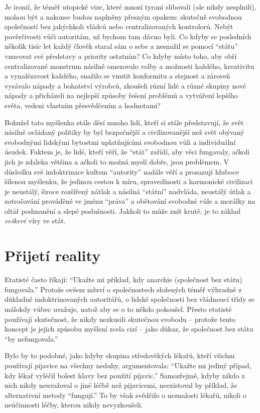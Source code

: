 \documentclass{book}
\begin{document}
Je ironií, že téměř utopické vize, které mnozí tyrani slibovali (ale nikdy nesplnili), mohou být a nakonec budou naplněny přesným opakem: skutečně svobodnou společností bez jakýchkoli vládců nebo centralizovaných kontrolorů. Nebýt pověrčivosti vůči autoritám, už bychom tam dávno byli. Co kdyby se posledních několik tisíc let každý člověk staral sám o sebe a nesnažil se pomocí \enquote{státu} vnucovat své představy a priority ostatním? Co kdyby místo toho, aby obří centralizované monstrum násilně omezovalo volby a možnosti každého, kreativitu a vynalézavost každého, snažilo se vnutit konformitu a stejnost a zároveň vysávalo nápady a bohatství výrobců, zkoušeli různí lidé a různé skupiny nové nápady a přicházeli na nejlepší způsoby řešení problémů a vytváření lepšího světa, vedeni vlastním přesvědčením a hodnotami?

Bohužel tato myšlenka stále děsí mnoho lidí, kteří si stále představují, že svět násilně ovládaný politiky by byl bezpečnější a civilizovanější než svět obývaný svobodnými lidskými bytostmi uplatňujícími svobodnou vůli a individuální úsudek. Faktem je, že lidé, kteří věří, že \enquote{stát} zařídí, aby věci fungovaly, ačkoli jich je zdaleka většina a ačkoli to možná myslí dobře, jsou problémem. V důsledku své indoktrinace kultem \enquote{autority} nadále věří a prosazují hluboce šílenou myšlenku, že jedinou cestou k míru, spravedlnosti a harmonické civilizaci je neustálý, široce rozšířený nátlak a násilná \enquote{státní} nadvláda, neustálý útlak a zotročování prováděné ve jménu \enquote{práva} a obětování svobodné vůle a morálky na oltář podmanění a slepé poslušnosti. Jakkoli to může znít krutě, je to základ \emph{veškeré} víry ve stát.

\section{Přijetí reality}

Etatisté často říkají: \enquote{Ukažte mi příklad, kdy anarchie (společnost bez státu) fungovala.} Protože ovšem mluví o společnostech složených téměř výhradně z důkladně indoktrinovaných autoritářů, o lidské společnosti bez vládnoucí třídy se málokdy vůbec uvažuje, natož aby se o to někdo pokoušel. Přesto etatisté používají skutečnost, že nikdy nezkusili skutečnou svobodu -- protože tento koncept je jejich způsobu myšlení zcela cizí -- jako důkaz, že společnost bez státu \enquote{by nefungovala.}

Bylo by to podobné, jako kdyby skupina středověkých lékařů, kteří všichni používají pijavice na všechny neduhy, argumentovala: \enquote{Ukažte mi jediný případ, kdy lékař vyléčil bolest hlavy bez použití pijavic.} Samozřejmě, kdyby nikdo z nich nikdy neuvažoval o jiné léčbě než pijavicemi, neexistoval by příklad, že alternativní metody \enquote{fungují.} To by však svědčilo o neznalosti lékařů, nikoli o neúčinnosti léčby, kterou nikdy nevyzkoušeli.
\end{document}
